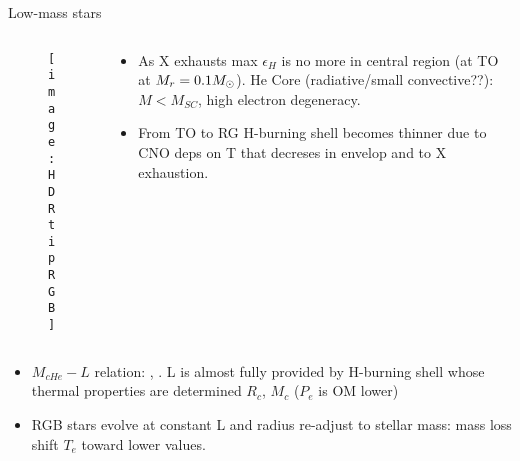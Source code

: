 \begin{frame}{Low-mass stars}
\begin{columns}[T]\begin{column}{0.5\textwidth}
\begin{figure}[!ht]
\texttt{[image: HDRtipRGB]}\label{fig:HDRtipRGB}
\end{figure}
\end{column}
\begin{column}{0.4\textwidth}
\begin{itemize}
\item As X exhausts max $\epsilon_H$ is no more in central region (at TO at $M_r=0.1M_{\odot}{}$). He Core (radiative/small convective??): $M<M_{SC}$, high electron degeneracy.
\item From TO to RG H-burning shell becomes thinner due to CNO deps on T that decreses in envelop and to X exhaustion.
\end{itemize}
\end{column}\end{columns}
\begin{itemize}
\item $M_{cHe}-L$ relation: , . L is almost fully provided by H-burning shell whose thermal properties are determined $R_c$, $M_c$ ($P_e$ is OM lower)
\item RGB stars evolve at constant L and radius re-adjust to stellar mass: mass loss shift $T_e$ toward lower values.
\end{itemize}
\end{frame}

